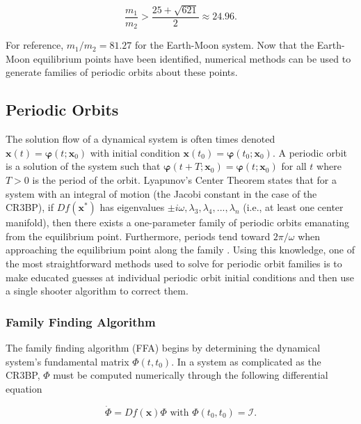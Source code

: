\documentclass[11pt]{article} %
\begin{document}
\begin{equation}
	\frac{m_1}{m_2} > \frac{25+\sqrt{621}}{2}\approx24.96.
\end{equation}

\noindent
For reference, $m_1/m_2=81.27$ for the Earth-Moon system. Now that the Earth-Moon equilibrium points have been identified, numerical methods can be used to generate families of periodic orbits about these points.

\subsection{Periodic Orbits}
The solution flow of a dynamical system is often times denoted $\bm{x}\left(t\right)=\bm{\varphi}\left(t;\bm{x}_0\right)$ with initial condition $\bm{x}\left(t_0\right)=\bm{\varphi}\left(t_0;\bm{x}_0\right)$. A periodic orbit is a solution of the system such that $\bm{\varphi}\left(t+T;\bm{x}_0\right) = \bm{\varphi}\left(t;\bm{x}_0\right)$ for all $t$ where $T>0$ is the period of the orbit. Lyapunov's Center Theorem states that for a system with an integral of motion (the Jacobi constant in the case of the CR3BP), if $Df\left(\bm{x}^*\right)$ has eigenvalues $\pm i\omega, \lambda_3, \lambda_4,...,\lambda_n$ (i.e., at least one center manifold), then there exists a one-parameter family of periodic orbits emanating from the equilibrium point. Furthermore, periods tend toward $2\pi/\omega$ when approaching the equilibrium point along the family \cite{MeyerHallOffin2016}. Using this knowledge, one of the most straightforward methods used to solve for periodic orbit families is to make educated guesses at individual periodic orbit initial conditions and then use a single shooter algorithm to correct them. 

\subsubsection{Family Finding Algorithm}
The family finding algorithm (FFA) begins by determining the dynamical system's fundamental matrix $\Phi\left(t,t_0\right)$. In a system as complicated as the CR3BP, $\Phi$ must be computed numerically through the following differential equation

\begin{equation}
	\dot{\Phi}=Df\left(\bm{x}\right)\Phi \text{ with } \Phi\left(t_0,t_0\right)=\mathcal{I}.
\end{equation}
\end{document}
